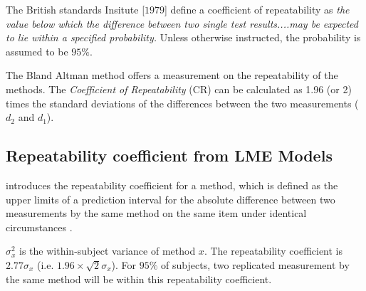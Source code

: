 \documentclass[12pt, a4paper]{article}
\begin{document}
The British standards Insitute [$1979$] define a coefficient of
repeatability  as \emph{the value below which the difference between two single test results....may be expected to lie within a specified probability.} Unless otherwise instructed, the
probability is assumed to be $95\%$. 

	The Bland Altman method offers a measurement on the repeatability of the methods. The \emph{Coefficient of Repeatability} (CR) can be calculated as 1.96 (or 2) times the standard deviations of the differences between the two measurements ($d_2$ and $d_1$).





	





\subsection{Repeatability coefficient from LME Models}
\citet{BA99} introduces the repeatability coefficient for a method, which is defined as the upper limits of a prediction interval for the absolute difference between two measurements by the same
method on the same item under identical circumstances \citep{BXC2008}.

$\sigma^2_{x}$ is the within-subject variance of method $x$. The repeatability coefficient is $2.77 \sigma_{x}$ (i.e. $1.96 \times \sqrt{2} \sigma_{x}$). For $95\%$ of subjects, two replicated measurement by the same method will be within this repeatability coefficient.




\end{document}

